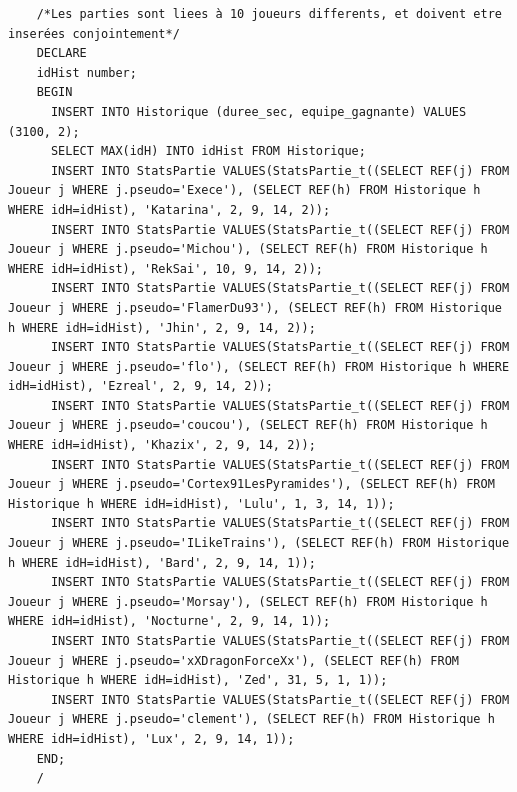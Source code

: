 \documentclass[a4paper,10pt]{report}
\begin{document}
\begin{lstlisting}
    /*Les parties sont liees à 10 joueurs differents, et doivent etre inserées conjointement*/
    DECLARE
    idHist number;
    BEGIN
      INSERT INTO Historique (duree_sec, equipe_gagnante) VALUES (3100, 2);
      SELECT MAX(idH) INTO idHist FROM Historique;
      INSERT INTO StatsPartie VALUES(StatsPartie_t((SELECT REF(j) FROM Joueur j WHERE j.pseudo='Exece'), (SELECT REF(h) FROM Historique h WHERE idH=idHist), 'Katarina', 2, 9, 14, 2));
      INSERT INTO StatsPartie VALUES(StatsPartie_t((SELECT REF(j) FROM Joueur j WHERE j.pseudo='Michou'), (SELECT REF(h) FROM Historique h WHERE idH=idHist), 'RekSai', 10, 9, 14, 2));
      INSERT INTO StatsPartie VALUES(StatsPartie_t((SELECT REF(j) FROM Joueur j WHERE j.pseudo='FlamerDu93'), (SELECT REF(h) FROM Historique h WHERE idH=idHist), 'Jhin', 2, 9, 14, 2));
      INSERT INTO StatsPartie VALUES(StatsPartie_t((SELECT REF(j) FROM Joueur j WHERE j.pseudo='flo'), (SELECT REF(h) FROM Historique h WHERE idH=idHist), 'Ezreal', 2, 9, 14, 2));
      INSERT INTO StatsPartie VALUES(StatsPartie_t((SELECT REF(j) FROM Joueur j WHERE j.pseudo='coucou'), (SELECT REF(h) FROM Historique h WHERE idH=idHist), 'Khazix', 2, 9, 14, 2));
      INSERT INTO StatsPartie VALUES(StatsPartie_t((SELECT REF(j) FROM Joueur j WHERE j.pseudo='Cortex91LesPyramides'), (SELECT REF(h) FROM Historique h WHERE idH=idHist), 'Lulu', 1, 3, 14, 1));
      INSERT INTO StatsPartie VALUES(StatsPartie_t((SELECT REF(j) FROM Joueur j WHERE j.pseudo='ILikeTrains'), (SELECT REF(h) FROM Historique h WHERE idH=idHist), 'Bard', 2, 9, 14, 1));
      INSERT INTO StatsPartie VALUES(StatsPartie_t((SELECT REF(j) FROM Joueur j WHERE j.pseudo='Morsay'), (SELECT REF(h) FROM Historique h WHERE idH=idHist), 'Nocturne', 2, 9, 14, 1));
      INSERT INTO StatsPartie VALUES(StatsPartie_t((SELECT REF(j) FROM Joueur j WHERE j.pseudo='xXDragonForceXx'), (SELECT REF(h) FROM Historique h WHERE idH=idHist), 'Zed', 31, 5, 1, 1));
      INSERT INTO StatsPartie VALUES(StatsPartie_t((SELECT REF(j) FROM Joueur j WHERE j.pseudo='clement'), (SELECT REF(h) FROM Historique h WHERE idH=idHist), 'Lux', 2, 9, 14, 1));
    END;
    /


\end{lstlisting}
\end{document}
